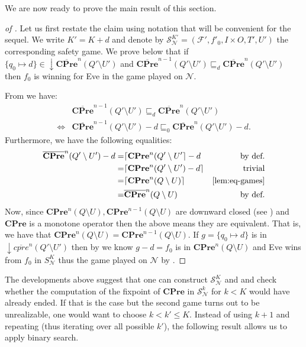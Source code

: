 \documentclass[runningheads,a4paper,draft]{llncs}
\newcommand{\cpre}{\mathbf{CPre}}
\newcommand{\calF}{\mathcal{F}}
\newcommand{\calN}{\mathcal{N}}
\newcommand{\calS}{\mathcal{S}}
\newcommand{\closedn}[1]{\mathrm{\downarrow} #1}
\begin{document}
We are now ready to prove the main result of this section.
\begin{proof}[of ]
  Let us first restate the claim using notation that will be convenient for
  the sequel. We write $K' = K + d$ and denote by $\calS_\calN^{K'} =
  (\calF',f'_0,I \times O, T',U')$ the corresponding safety game. We prove
  below that if $\{q_0 \mapsto d\} \in \closedn{\overline{\cpre}^n(Q'
  \setminus U')}$ and $\overline{\cpre}^{n-1}(Q'\setminus U') \sqsubseteq_d
  \overline{\cpre}^n(Q' \setminus U')$ then $f_0$ is winning for Eve in
  the game played on $\calN$.

  From   we have:
  \begin{align*}
    &\overline{\cpre}^{n-1}(Q' \setminus U') \sqsubseteq_d
    \overline{\cpre}^n(Q' \setminus U')\\
    \iff & \overline{\cpre}^{n-1}(Q' \setminus U') - d \sqsubseteq_0
    \overline{\cpre}^n(Q' \setminus U') - d.
  \end{align*}
  Furthermore, we have the following equalities:
  \begin{align*}
    \overline{\cpre}^n(Q' \setminus U') - d = & \lceil \cpre^n(Q' \setminus
    U'\rceil -d & \text{by def.}\\
    = & \lceil \cpre^n(Q' \setminus U') -d \rceil & \text{trivial}\\
    = & \lceil \cpre^n(Q \setminus U) \rceil & \text{\Cref{lem:eq-games}}\\
    = & \overline{\cpre}^n(Q \setminus U) & \text{by def.}
  \end{align*}
  Now, since $\cpre^n(Q \setminus U), \cpre^{n-1}(Q \setminus U)$ are downward
  closed (see ) and $\cpre$ is a monotone operator then
  the above means they are equivalent. That is, we have that $\cpre^n(Q
  \setminus U) = \cpre^{n-1}(Q \setminus U)$. If $g = \{q_0 \mapsto d\}$ is in
  $\closedn{ \overline{cpre}^n(Q' \setminus U') }$ then by
   we know $g - d = f_0$ is in $\cpre^n(Q \setminus U)$ and
  Eve wins from $f_0$ in $S^K_\calN$ thus the game played on $\calN$
  by .
\end{proof}

The developments above suggest that one can construct $\calS^K_\calN$ and and
check whether the computation of the fixpoint of $\cpre$ in $\calS^{k}_\calN$
for $k < K$ would have already ended. If that is the case but the second game
turns out to be unrealizable, one would want to choose $k < k' \leq K$.
Instead of using $k + 1$ and repeating (thus iterating over all possible
$k'$), the following result allows us to apply binary search.
\end{document}
